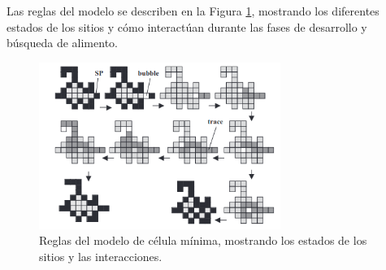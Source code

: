     \vskip 0.5cm
    Las reglas del modelo se describen en la Figura \ref{fig:cell_rules}, mostrando los diferentes 
        estados de los sitios y c\'omo interact\'uan durante las fases de desarrollo y b\'usqueda de alimento.
    \vskip 0.5cm
    \begin{figure}[h]
        \centering
        \includegraphics[width=0.7\textwidth]{./images/estado_del_arte/physarum/rGunji.png}
        \caption{Reglas del modelo de c\'elula m\'inima, mostrando los estados de los sitios y las interacciones. \cite{gunji2008}}
        \label{fig:cell_rules}
    \end{figure}
